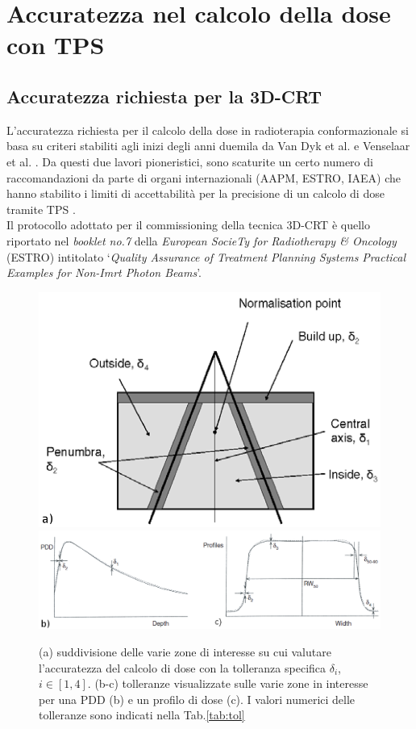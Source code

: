 \section{Accuratezza nel calcolo della dose con TPS}
\subsection{Accuratezza richiesta per la 3D-CRT}
\label{sec:accu_3D}
L'accuratezza richiesta per il calcolo della dose in radioterapia conformazionale si basa su criteri stabiliti agli inizi degli anni duemila da Van Dyk et al. e Venselaar et al. \cite{Dyk1993,Venselaar2001}. Da questi due lavori pioneristici, sono scaturite un certo numero di raccomandazioni da parte di organi internazionali (AAPM, ESTRO, IAEA) che hanno stabilito i limiti di accettabilità per la precisione di un calcolo di dose tramite TPS \cite{Fraass1998,Mijnheer2004,IAEA430}.\\
Il protocollo adottato per il commissioning della tecnica 3D-CRT è quello riportato nel \textit{booklet no.7} della \textit{European SocieTy for Radiotherapy \& Oncology} (ESTRO) intitolato `\textit{Quality Assurance of Treatment Planning Systems Practical Examples for Non-Imrt Photon Beams}'. 
\begin{figure}
\centering
\includegraphics[width=.65\textwidth]{./cap2/Accuracy_zones.png}\\\vspace{.3cm}
\includegraphics[width=\textwidth]{./cap2/Accuracy_pdd_prof.png}
\caption{(a) suddivisione delle varie zone di interesse su cui valutare l'accuratezza del calcolo di dose con la tolleranza specifica $\delta_i$, $i\in[1,4]$. (b-c) tolleranze visualizzate sulle varie zone in interesse per una PDD (b) e un profilo di dose (c). I valori numerici delle tolleranze sono indicati nella Tab.\ref{tab:tol}}
\label{fig:accuracy_zones}
\end{figure}

